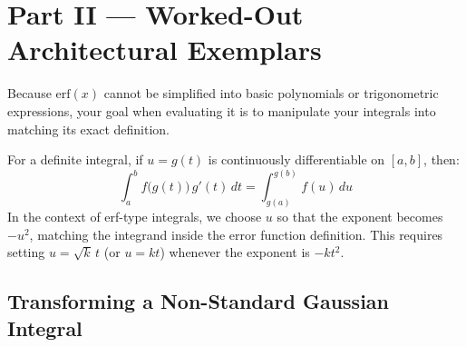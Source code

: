 \documentclass[11pt]{article}
\begin{document}
\clearpage
{}
{}
\section*{Part II --- Worked-Out Architectural Exemplars}
\setcounter{section}{2}

Because $\text{erf}(x)$ cannot be simplified into basic polynomials or trigonometric expressions, your goal when evaluating it is to manipulate your integrals into matching its exact definition.

\begin{defnbox}
For a definite integral, if $u = g(t)$ is continuously differentiable on $[a,b]$, then:
\[ \int_{a}^{b} f\!\bigl(g(t)\bigr)\,g'(t)\,dt = \int_{g(a)}^{g(b)} f(u)\,du \]
In the context of erf-type integrals, we choose $u$ so that the exponent becomes $-u^2$, matching the integrand inside the error function definition. This requires setting $u = \sqrt{k}\,t$ (or $u = kt$) whenever the exponent is $-kt^2$.
\end{defnbox}

\subsection{Transforming a Non-Standard Gaussian Integral}
\end{document}
